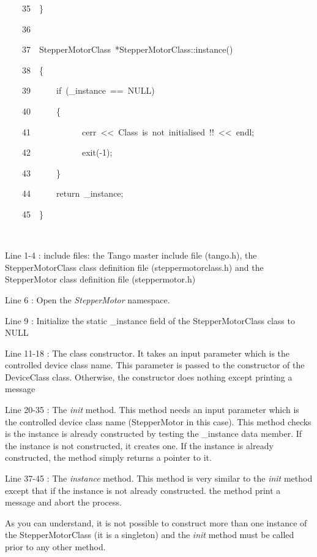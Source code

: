 \begin{lyxcode}
~~~~35~~\}

~~~~36~~

~~~~37~~StepperMotorClass~{*}StepperMotorClass::instance()

~~~~38~~\{

~~~~39~~~~~~if~(\_instance~==~NULL)

~~~~40~~~~~~\{

~~~~41~~~~~~~~~~~~cerr~<\textcompwordmark{}<~\textquotedbl{}Class~is~not~initialised~!!\textquotedbl{}~<\textcompwordmark{}<~endl;

~~~~42~~~~~~~~~~~~exit(-1);

~~~~43~~~~~~\}

~~~~44~~~~~~return~\_instance;

~~~~45~~\}

~
\end{lyxcode}


Line 1-4 : include files: the Tango master include file (tango.h),
the StepperMotorClass class definition file (steppermotorclass.h)
and the StepperMotor class definition file (steppermotor.h)

Line 6 : Open the \emph{StepperMotor} namespace.

Line 9 : Initialize the static \_instance field of the StepperMotorClass
class to NULL

Line 11-18 : The class constructor. It takes an input parameter which
is the controlled device class name. This parameter is passed to the
constructor of the DeviceClass class. Otherwise,
the constructor does nothing except printing a message

Line 20-35 : The \emph{init} method. This method needs
an input parameter which is the controlled device class name (StepperMotor
in this case). This method checks is the instance is already constructed
by testing the \_instance data member. If the instance is not constructed,
it creates one. If the instance is already constructed, the method
simply returns a pointer to it.

Line 37-45 : The \emph{instance} method. This method is very similar
to the \emph{init} method except that if the instance is not already
constructed. the method print a message and abort the process.

As you can understand, it is not possible to construct more than one
instance of the StepperMotorClass (it is a singleton)
and the \emph{init} method must be called prior to any other method.

